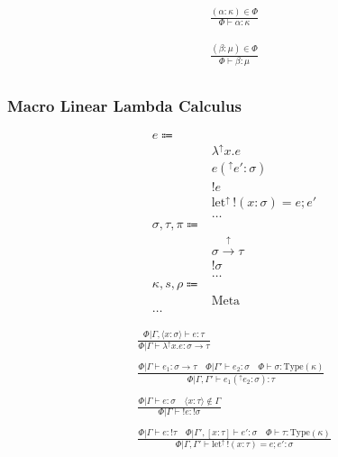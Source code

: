 \documentclass {article}
\begin{document}
\begin{gather*}
\frac
{(\alpha : \kappa) \in \Phi}
{\Phi \vdash \alpha : \kappa}
\end{gather*}

\begin{gather*}
\frac
{(\beta : \mu) \in \Phi}
{\Phi \vdash \beta : \mu } \\
\end{gather*}

\subsubsection{Macro Linear Lambda Calculus}
\begin{align*}
e \Coloneqq & \\
& \lambda^\uparrow x. e \tag{Macro Lambda}\\
& e(^\uparrow e' : \sigma) \tag{Macro Application}\\
& !e \tag{Bang Introduction} \\
& \text{let}^\uparrow \, !(x : \sigma) = e; e' \tag{Bang Elimination} \\
& \dots \\
\sigma, \tau, \pi \Coloneqq & \\
& \sigma \xrightarrow{\uparrow} \tau \tag{Macro} \\
& !\sigma \tag{Bang} \\
& \dots \\
\kappa, s, \rho \Coloneqq & \\
& \text{Meta} \tag{Meta Stage} \\
\dots
\end{align*}

\begin{gather*}
\frac
{\Phi | \Gamma, \langle x : \sigma \rangle \vdash e : \tau}
{\Phi | \Gamma \vdash \lambda^\uparrow x. e : \sigma \to \tau } \\
\\
\frac
{\Phi | \Gamma \vdash e_1 : \sigma \to \tau \quad \Phi | \Gamma' \vdash e_2 : \sigma \quad \Phi \vdash \sigma : \text{Type} (\kappa)}
{\Phi | \Gamma, \Gamma' \vdash e_1(^\uparrow e_2 : \sigma) : \tau} \\
\\
\frac
{\Phi | \Gamma \vdash e : \sigma \quad \langle x : \tau \rangle \notin \Gamma }
{\Phi | \Gamma \vdash !e : !\sigma } \\
\\
\frac
{\Phi | \Gamma \vdash e : !\tau \quad \Phi | \Gamma', [x : \tau] \vdash e' : \sigma \quad \Phi \vdash \tau : \text{Type} (\kappa) }
{\Phi | \Gamma, \Gamma' \vdash \text{let}^\uparrow \, !(x : \tau) = e; e' : \sigma}  \\
\end{gather*}
\end{document}
